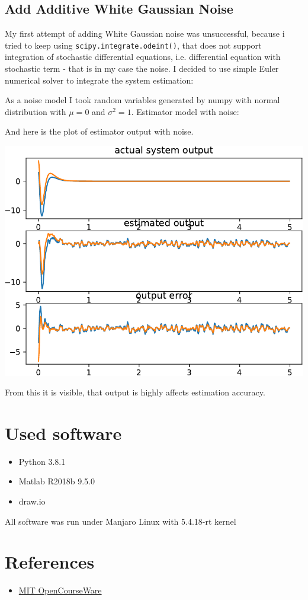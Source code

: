 \documentclass[a4paper,12pt]{article}
\begin{document}
\subsection{Add Additive White Gaussian Noise}
My first attempt of adding White Gaussian noise was unsuccessful, because i tried
to keep using \texttt{scipy.integrate.odeint()}, that does not support integration
of stochastic differential equations, i.e. differential equation with stochastic 
term - that is in my case the noise.
I decided to use simple Euler numerical solver to integrate the system estimation:

As a noise model I took random variables generated by numpy with normal distribution
with $\mu=0$ and $\sigma^2=1$. Estimator model with noise:

And here is the plot of estimator output with noise.
\begin{center}
    \includegraphics[width=\linewidth]{../Task2/est_cont_noise_out.pdf}
\end{center}
From this it is visible, that output is highly affects estimation accuracy.

\section{Used software}
\begin{itemize}
    \item Python 3.8.1
    \item Matlab R2018b 9.5.0
    \item draw.io
\end{itemize}
All software was run under Manjaro Linux with 5.4.18-rt kernel
\section{References}
\begin{itemize}
    \item \href{https://ocw.mit.edu/courses/aeronautics-and-astronautics/16-30-feedback-control-systems-fall-2010/lecture-notes/MIT16_30F10_lec14.pdf}
    {MIT OpenCourseWare}
\end{itemize}
\end{document}
